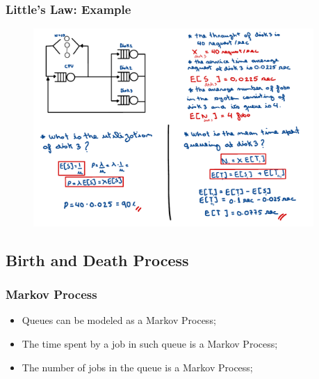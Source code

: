 \begin{frame}
    \frametitle{Little's Law: Example}
    \begin{figure}
        \centering
        \includegraphics[width=0.95\textwidth]{slides/figures/little_law_closed_example.pdf}
    \end{figure}
\end{frame}


\subsection{Birth and Death Process}


\begin{frame}
    \frametitle{Markov Process}
    \begin{itemize}
        \item Queues can be modeled as a Markov Process;

        \item The time spent by a job in such queue is a Markov Process;

        \item The number of jobs in the queue is a Markov Process;
    \end{itemize}
\end{frame}



